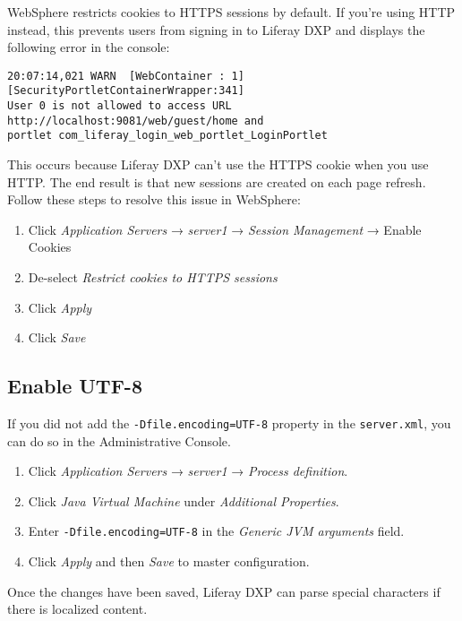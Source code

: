 WebSphere restricts cookies to HTTPS sessions by default. If you're
using HTTP instead, this prevents users from signing in to Liferay DXP
and displays the following error in the console:

\begin{verbatim}
20:07:14,021 WARN  [WebContainer : 1][SecurityPortletContainerWrapper:341]
User 0 is not allowed to access URL http://localhost:9081/web/guest/home and
portlet com_liferay_login_web_portlet_LoginPortlet
\end{verbatim}

This occurs because Liferay DXP can't use the HTTPS cookie when you use
HTTP. The end result is that new sessions are created on each page
refresh. Follow these steps to resolve this issue in WebSphere:

\begin{enumerate}
\def\labelenumi{\arabic{enumi}.}
\item
  Click \emph{Application Servers} → \emph{server1} → \emph{Session
  Management} → Enable Cookies
\item
  De-select \emph{Restrict cookies to HTTPS sessions}
\item
  Click \emph{Apply}
\item
  Click \emph{Save}
\end{enumerate}

\subsection{Enable UTF-8}\label{enable-utf-8}

If you did not add the \texttt{-Dfile.encoding=UTF-8} property in the
\texttt{server.xml}, you can do so in the Administrative Console.

\begin{enumerate}
\def\labelenumi{\arabic{enumi}.}
\item
  Click \emph{Application Servers} → \emph{server1} → \emph{Process
  definition}.
\item
  Click \emph{Java Virtual Machine} under \emph{Additional Properties}.
\item
  Enter \texttt{-Dfile.encoding=UTF-8} in the \emph{Generic JVM
  arguments} field.
\item
  Click \emph{Apply} and then \emph{Save} to master configuration.
\end{enumerate}

Once the changes have been saved, Liferay DXP can parse special
characters if there is localized content.

